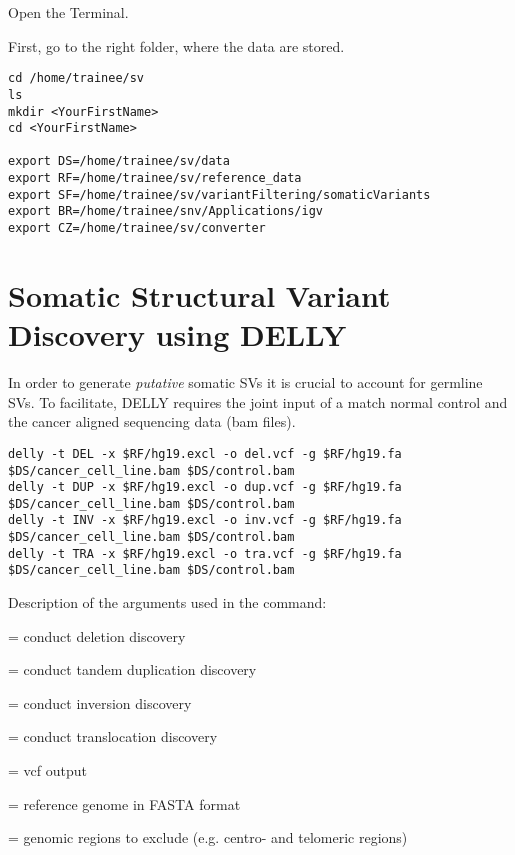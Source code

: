\begin{steps}
Open the Terminal.

First, go to the right folder, where the data are stored.
\begin{lstlisting}
cd /home/trainee/sv
ls
mkdir <YourFirstName>
cd <YourFirstName>

export DS=/home/trainee/sv/data
export RF=/home/trainee/sv/reference_data
export SF=/home/trainee/sv/variantFiltering/somaticVariants
export BR=/home/trainee/snv/Applications/igv
export CZ=/home/trainee/sv/converter

\end{lstlisting}

\end{steps}

\section{Somatic Structural Variant Discovery using DELLY}

\begin{information}
In order to generate \emph{putative} somatic SVs it is crucial to account for germline SVs. To facilitate, DELLY requires the joint input of a match normal control and the cancer aligned sequencing data (bam files).
\end{information}

\begin{lstlisting}
delly -t DEL -x $RF/hg19.excl -o del.vcf -g $RF/hg19.fa $DS/cancer_cell_line.bam $DS/control.bam
delly -t DUP -x $RF/hg19.excl -o dup.vcf -g $RF/hg19.fa $DS/cancer_cell_line.bam $DS/control.bam
delly -t INV -x $RF/hg19.excl -o inv.vcf -g $RF/hg19.fa $DS/cancer_cell_line.bam $DS/control.bam
delly -t TRA -x $RF/hg19.excl -o tra.vcf -g $RF/hg19.fa $DS/cancer_cell_line.bam $DS/control.bam

\end{lstlisting}

Description of the arguments used in the command: 
\begin{description}[style=multiline,labelindent=0cm,align=right,leftmargin=\descriptionlabelspace,rightmargin=1.5cm,font=\ttfamily]
  \item[DEL] = conduct deletion discovery
  \item[DUP] = conduct tandem duplication discovery
  \item[INV] = conduct inversion discovery 
  \item[TRA] = conduct translocation discovery
  \item[-o] = vcf output
  \item[-g] = reference genome in FASTA format
  \item[-x] = genomic regions to exclude (e.g. centro- and telomeric regions)
\end{description}

